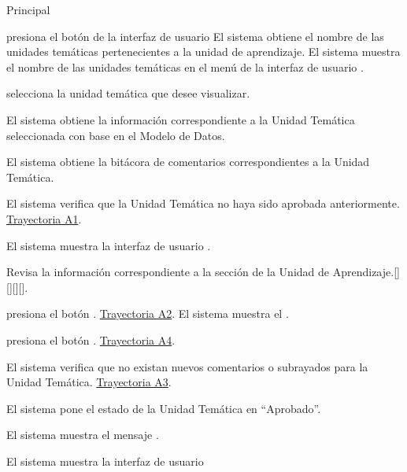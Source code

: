 \begin{UCtrayectoria}{Principal}

    \UCpaso[\UCactor] presiona el botón   de la interfaz de usuario 
	\UCpaso El sistema obtiene el nombre de las unidades temáticas pertenecientes a la unidad de aprendizaje.
	\UCpaso El sistema muestra el nombre de las unidades temáticas en el menú de la interfaz  de usuario .

    \UCpaso[\UCactor] selecciona la unidad temática que desee visualizar.
     
         \UCpaso El sistema obtiene la información correspondiente a la Unidad Temática seleccionada con base en el Modelo de Datos.
         
    \UCpaso El sistema obtiene la bitácora de comentarios correspondientes a la Unidad Temática. 
    
    \UCpaso El sistema verifica que la Unidad Temática   no haya sido aprobada anteriormente.  \hyperlink{SP2-CU10-A1}{Trayectoria A1}. 
    
    \UCpaso El sistema muestra la interfaz de usuario  . 
    
    \UCpaso[\UCactor] Revisa la información correspondiente a la sección de la Unidad de Aprendizaje.[][][][].
    
    \UCpaso[\UCactor] presiona el botón . \hyperlink{SP2-CU10-A2}{Trayectoria A2}.
    \UCpaso El sistema muestra el .
    
    \UCpaso [\UCactor] presiona el botón . \hyperlink{SP2-CU10-A4}{Trayectoria A4}.
    
    \UCpaso	El sistema verifica que no existan nuevos comentarios o subrayados para la Unidad Temática.  \hyperlink{SP2-CU10-A3}{Trayectoria A3}. 
    
    \UCpaso El sistema pone el estado de la Unidad Temática en “Aprobado”.
    
    \UCpaso El sistema muestra el mensaje .

    \UCpaso El sistema muestra la interfaz de usuario 

\end{UCtrayectoria}

